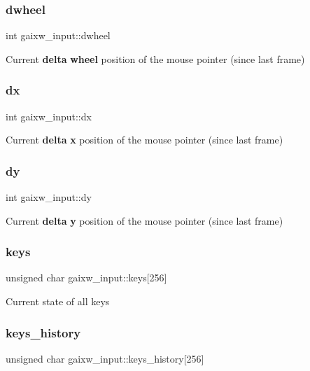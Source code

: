 \subsubsection{\texorpdfstring{dwheel}{dwheel}}
{\footnotesize\ttfamily int gaixw\+\_\+input\+::dwheel}

Current {\bfseries delta} {\bfseries wheel} position of the mouse pointer (since last frame) \mbox{\label{structgaixw__input_a676ed5ef08464952452a00774ac306fc}} 
\subsubsection{\texorpdfstring{dx}{dx}}
{\footnotesize\ttfamily int gaixw\+\_\+input\+::dx}

Current {\bfseries delta} {\bfseries x} position of the mouse pointer (since last frame) \mbox{\label{structgaixw__input_a6635cb3b3ef5f868a620069f20e368b6}} 
\subsubsection{\texorpdfstring{dy}{dy}}
{\footnotesize\ttfamily int gaixw\+\_\+input\+::dy}

Current {\bfseries delta} {\bfseries y} position of the mouse pointer (since last frame) \mbox{\label{structgaixw__input_ab0a6fb70cf772d62d05bce47884256cb}} 
\subsubsection{\texorpdfstring{keys}{keys}}
{\footnotesize\ttfamily unsigned char gaixw\+\_\+input\+::keys\mbox{[}256\mbox{]}}

Current state of all keys \mbox{\label{structgaixw__input_aeefc7998758b3f5783de412a70e9e0ca}} 
\subsubsection{\texorpdfstring{keys\+\_\+history}{keys\_history}}
{\footnotesize\ttfamily unsigned char gaixw\+\_\+input\+::keys\+\_\+history\mbox{[}256\mbox{]}}

